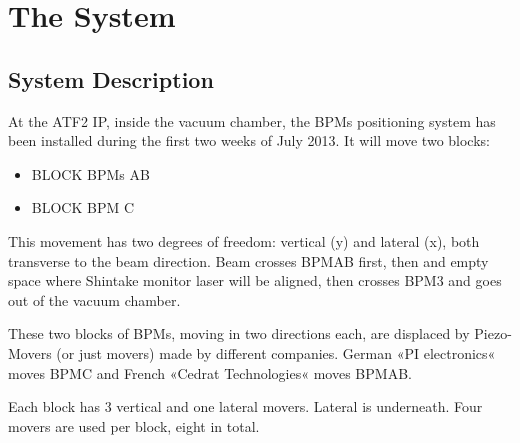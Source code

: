 \chapter{The System}
\section{System Description}
At the ATF2 IP, inside the vacuum chamber, the BPMs positioning system has been installed during the first two weeks of July 2013.
It will move two blocks:
\begin{itemize}
\item BLOCK BPMs AB
\item BLOCK BPM C
\end{itemize}
This movement has two degrees of freedom: vertical (y) and lateral (x), both transverse to the beam direction. Beam crosses BPMAB first, then and empty space where Shintake monitor laser will be aligned, then crosses BPM3 and goes out of the vacuum chamber.

These two blocks of BPMs, moving in two directions each, are displaced by Piezo-Movers (or just movers) made by different companies. German «PI electronics« moves  BPMC and French «Cedrat Technologies« moves BPMAB.

Each block has 3 vertical and one lateral movers. Lateral is underneath. Four movers are used per block, eight in total.

